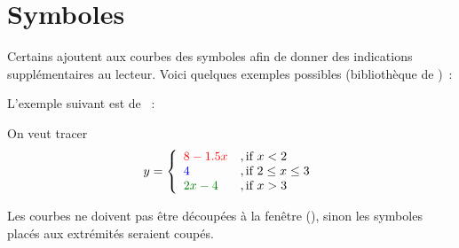 \section{Symboles}
Certains ajoutent aux courbes des symboles afin de donner des indications supplémentaires au lecteur. Voici quelques exemples possibles (bibliothèque  de \TIKZ)~:


\newcommand{\cred}[1]{{\color{red}#1}}
\newcommand{\cgreen}[1]{{\color{green!50!black}#1}}
\newcommand{\cblue}[1]{{\color{blue}#1}}

L'exemple suivant est de ~:

On veut tracer
\[
y=\left\{\begin{array}{ll}
    \cred{8-1.5x}&,\text{if }x<2\\
    \cblue{4}&,\text{if }2 \leq x \leq 3\\
    \cgreen{2x-4}&,\text{if } x>3
  \end{array}
\right.
\]

Les courbes ne doivent pas être découpées à la fenêtre (), sinon les symboles placés aux extrémités seraient coupés.

\begin{center}
\begin{tkzexample}[vbox]
\end{tkzexample}
\end{center}

\endinput
